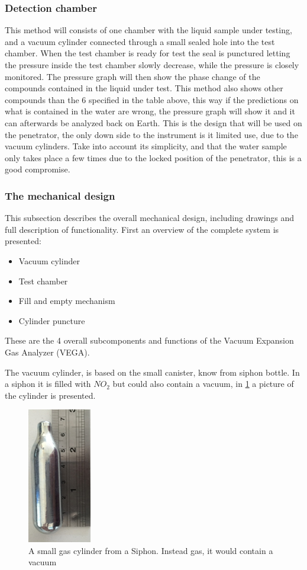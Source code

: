 \subsubsection{Detection chamber}

This method will consists of one chamber with the liquid sample under testing, and a vacuum cylinder connected through a small sealed hole into the test chamber. When the test chamber is ready for test the seal is punctured letting the pressure inside the test chamber slowly decrease, while the pressure is closely monitored. The pressure graph will then show the phase change of the compounds contained in the liquid under test. This method also shows other compounds than the 6 specified in the table above, this way if the predictions on what is contained in the water are wrong, the pressure graph will show it and it can afterwards be analyzed back on Earth. This is the design that will be used on the penetrator, the only down side to the instrument is it limited use, due to the vacuum cylinders. Take into account its simplicity, and that the water sample only takes place a few times due to the locked position of the penetrator, this is a good compromise.

\subsubsection{The mechanical design}

This subsection describes the overall mechanical design, including drawings and full description of functionality. First an overview of the complete system is presented:
\begin{itemize}
  \item Vacuum cylinder
  \item Test chamber
  \item Fill and empty mechanism
  \item Cylinder puncture
\end{itemize}
These are the 4 overall subcomponents and functions of the Vacuum Expansion Gas Analyzer (VEGA).

The vacuum cylinder, is based on the small canister, know from siphon bottle. In a siphon it is filled with $NO_2$ but could also contain a vacuum, in \ref{fig:Sipon} a picture of the cylinder is presented.

\begin{figure}[htb]
  \centering
  \includegraphics[scale=1]{figures/GasDetectionAgge/SiphonCylinder}
  \caption{A small gas cylinder from a Siphon. Instead gas, it would contain a vacuum}
  \label{fig:Sipon}
\end{figure}

